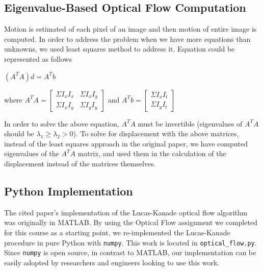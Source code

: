 \documentclass[]{article}
\begin{document}
\subsection{Eigenvalue-Based Optical Flow Computation}\label{subsec:eigenvalue-based-optical-flow-computation}
Motion is estimated of each pixel of an image and then motion of entire image is computed.
In order to address the problem when we have more equations than unknowns, we used least squares method to address it.
Equation could be represented as follows
\begin{center} $(A^T A) d = A^T b$ \end{center}
\setlength{\parskip}{10pt plus 1pt minus 1pt}
where  $ A^T A  =  \begin{bmatrix}
                    \Sigma I_xI_x  & \Sigma I_xI_y    \\
                    \Sigma I_xI_y  & \Sigma I_yI_y 
                    \end{bmatrix} $  and $A^T b = \begin{bmatrix}
                                                   \Sigma I_xI_t  \\
                                                   \Sigma I_yI_t
                                                   \end{bmatrix}$
\setlength{\parskip}{10pt plus 1pt minus 1pt}

In order to solve the above equation, $A^T A$ must be invertible (eigenvalues of $A^T A$ should be $\lambda_1 \geq \lambda_2 > 0$).
To solve for displacement with the above matrices, instead of the least squares approach in the original paper, we have computed eigenvalues of the $A^T A$ matrix, and used them in the calculation of the displacement instead of the matrices themselves.

\subsection{Python Implementation}\label{subsec:python-implementation}
The cited paper's implementation of the Lucas-Kanade optical flow algorithm was originally in MATLAB.
By using the Optical Flow assignment we completed for this course as a starting point, we re-implemented the Lucas-Kanade procedure in pure Python with \texttt{numpy}.
This work is located in \verb|optical_flow.py|.
Since \texttt{numpy} is open source, in contrast to MATLAB, our implementation can be easily adopted by researchers and engineers looking to use this work.
\end{document}

